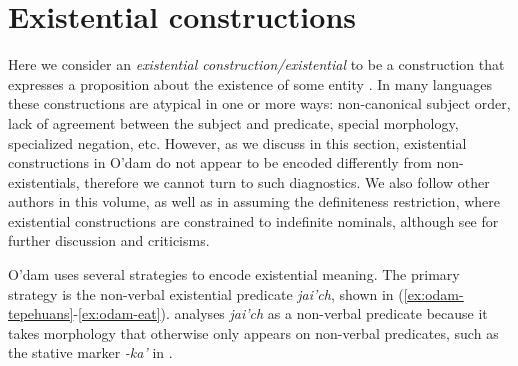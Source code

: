 \documentclass[output=paper,draft,draftmode,colorlinks,citecolor=brown]{langscibook}
\begin{document}
\section{Existential constructions}
\label{sec:odam-excont}
Here we consider an \emph{existential construction/existential} to be a construction that expresses a proposition about the existence of some entity \citep[1829]{mcnally2011}. In many languages these constructions are atypical in one or more ways: non-canonical subject order, lack of agreement between the subject and predicate, special morphology, specialized negation, etc. However, as we discuss in this section, existential constructions in O'dam do not appear to be encoded differently from non-existentials, therefore we cannot turn to such diagnostics. We also follow other authors in this volume, as well as \citet{Veselinova2014,Veselinova2016} in assuming the definiteness restriction, where existential constructions are constrained to indefinite nominals, although see \citet{ziv1982,reulanm1987,abbott1997,beaveretal2006,McNally2016} for further discussion and criticisms. 

O’dam uses several strategies to encode existential meaning. The primary
strategy is the non-verbal existential predicate \emph{jai’ch}, shown in
(\ref{ex:odam-tepehuans}-\ref{ex:odam-eat}). \citet[93]{garcia2014}
analyses \emph{jai’ch} as a non-verbal predicate because it takes
morphology that otherwise only appears on non-verbal predicates, such as
the stative marker  \emph{-ka’} in .%
\end{document}
